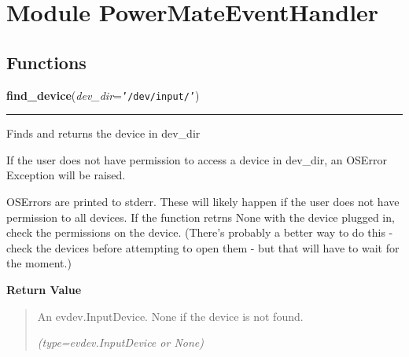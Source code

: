 %
%
%


\section{Module PowerMateEventHandler}

    \label{PowerMateEventHandler}


  \subsection{Functions}

    \label{PowerMateEventHandler:find_device}

    \vspace{0.5ex}

\hspace{.8\funcindent}\begin{boxedminipage}{\funcwidth}

    \raggedright \textbf{find\_device}(\textit{dev\_dir}={\tt \texttt{'}\texttt{/dev/input/}\texttt{'}})

    \vspace{-1.5ex}

    \rule{\textwidth}{0.5\fboxrule}
\setlength{\parskip}{2ex}
    Finds and returns the device in dev\_dir

    If the user does not have permission to access a device in dev\_dir, an
    OSError Exception will be raised.

    OSErrors are printed to stderr. These will likely happen if the user 
    does not have permission to all devices. If the function retrns None 
    with the device plugged in, check the permissions on the device. 
    (There's probably a better way to do this - check the devices before 
    attempting to open them - but that will have to wait for the moment.)

\setlength{\parskip}{1ex}
      \textbf{Return Value}
    \vspace{-1ex}

      \begin{quote}
      An evdev.InputDevice. None if the device is not found.

      {\it (type=evdev.InputDevice or None)}

      \end{quote}

    \end{boxedminipage}

